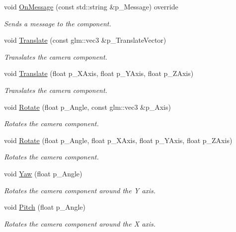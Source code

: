 \begin{DoxyCompactItemize}
void \mbox{\hyperlink{class_camera_component_aa4c591ae0309634d43d7cee341eb6abf}{On\+Message}} (const std\+::string \&p\+\_\+\+Message) override
\begin{DoxyCompactList}\small\item\em Sends a message to the component. \end{DoxyCompactList}\item 
void \mbox{\hyperlink{class_camera_component_a4d35b8d9c30b1a0a2333ccd947697cb5}{Translate}} (const glm\+::vec3 \&p\+\_\+\+Translate\+Vector)
\begin{DoxyCompactList}\small\item\em Translates the camera component. \end{DoxyCompactList}\item 
void \mbox{\hyperlink{class_camera_component_a27e2e9bdcd4d673967b9187cb3524e5b}{Translate}} (float p\+\_\+\+X\+Axis, float p\+\_\+\+Y\+Axis, float p\+\_\+\+Z\+Axis)
\begin{DoxyCompactList}\small\item\em Translates the camera component. \end{DoxyCompactList}\item 
void \mbox{\hyperlink{class_camera_component_a58318ce1f0b1fa97da82d4304beb4005}{Rotate}} (float p\+\_\+\+Angle, const glm\+::vec3 \&p\+\_\+\+Axis)
\begin{DoxyCompactList}\small\item\em Rotates the camera component. \end{DoxyCompactList}\item 
void \mbox{\hyperlink{class_camera_component_ad7e109b916a367c044179997b888635b}{Rotate}} (float p\+\_\+\+Angle, float p\+\_\+\+X\+Axis, float p\+\_\+\+Y\+Axis, float p\+\_\+\+Z\+Axis)
\begin{DoxyCompactList}\small\item\em Rotates the camera component. \end{DoxyCompactList}\item 
void \mbox{\hyperlink{class_camera_component_a665ea0b0d19c8532acddd6fe84ba0ae4}{Yaw}} (float p\+\_\+\+Angle)
\begin{DoxyCompactList}\small\item\em Rotates the camera component around the Y axis. \end{DoxyCompactList}\item 
void \mbox{\hyperlink{class_camera_component_aaad279e1a0e4050cff1ed8072d40f7b1}{Pitch}} (float p\+\_\+\+Angle)
\begin{DoxyCompactList}\small\item\em Rotates the camera component around the X axis. \end{DoxyCompactList}\item 

\end{DoxyCompactItemize}
